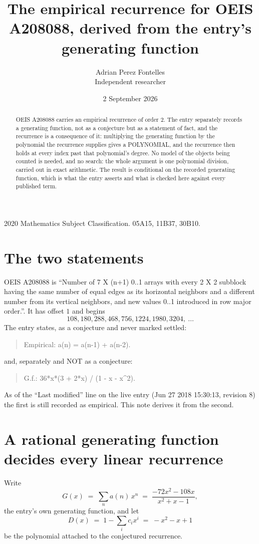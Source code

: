 \documentclass[11pt,a4paper]{article}
\title{The empirical recurrence for OEIS A208088, derived from the entry's generating function}
\author{Adrian Perez Fontelles\\ \small Independent researcher}
\date{2 September 2026}
\theoremstyle{plain}
\theoremstyle{definition}
\begin{document}
\maketitle

\begin{abstract}
OEIS A208088 carries an empirical recurrence of order $2$. The entry separately records a
generating function, not as a conjecture but as a statement of fact, and the recurrence is a
consequence of it: multiplying the generating function by the polynomial the recurrence
supplies gives a POLYNOMIAL, and the recurrence then holds at every index past that
polynomial's degree. No model of the objects being counted is needed, and no search: the
whole argument is one polynomial division, carried out in exact arithmetic. The result is
conditional on the recorded generating function, which is what the entry asserts and what is
checked here against every published term.
\end{abstract}

\noindent\small 2020 Mathematics Subject Classification. 05A15, 11B37, 30B10.\normalsize

\section{The two statements}

OEIS A208088 is ``Number of 7 X (n+1) 0..1 arrays with every 2 X 2 subblock having the same number of equal edges as its horizontal neighbors and a different number from its vertical neighbors, and new values 0..1 introduced in row major order.''. It has offset $1$ and begins
\[
108, 180, 288, 468, 756, 1224, 1980, 3204,\ \dots
\]
The entry states, as a conjecture and never marked settled:
\begin{quote}
Empirical: a(n) = a(n-1) + a(n-2).
\end{quote}
and, separately and NOT as a conjecture:
\begin{quote}
G.f.: 36*x*(3 + 2*x) / (1 - x - x\^{}2).
\end{quote}
As of the ``Last modified'' line on the live entry (Jun 27 2018 15:30:13, revision 8) the first is still
recorded as empirical. This note derives it from the second.

\section{A rational generating function decides every linear recurrence}

Write
\[
G(x)\;=\;\sum_{n}a(n)\,x^{n}\;=\;\frac{- 72 x^{2} - 108 x}{x^{2} + x - 1},
\]
the entry's own generating function, and let
\[
D(x)\;=\;1-\sum_i c_i x^{i}\;=\;- x^{2} - x + 1
\]
be the polynomial attached to the conjectured recurrence.
\end{document}
